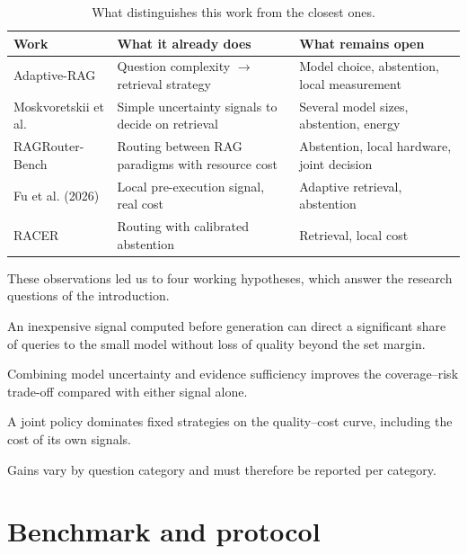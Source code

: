 \documentclass[11pt,a4paper]{article}
\begin{document}
\begin{table}[H]
\centering\small
\begin{tabularx}{\textwidth}{l Y Y}
\toprule
\textbf{Work} & \textbf{What it already does} & \textbf{What remains open} \\
\midrule
Adaptive-RAG & Question complexity $\rightarrow$ retrieval strategy & Model choice, abstention, local measurement \\
Moskvoretskii et al. & Simple uncertainty signals to decide on retrieval & Several model sizes, abstention, energy \\
RAGRouter-Bench & Routing between RAG paradigms with resource cost & Abstention, local hardware, joint decision \\
Fu et al. (2026) & Local pre-execution signal, real cost & Adaptive retrieval, abstention \\
RACER & Routing with calibrated abstention & Retrieval, local cost \\
\bottomrule
\end{tabularx}
\caption{What distinguishes this work from the closest ones.}
\label{tab:distinction}
\end{table}

These observations led us to four working hypotheses, which answer the research questions of the
introduction.

\begin{description}[style=sameline,leftmargin=1cm]
\item[H1] An inexpensive signal computed before generation can direct a significant share of queries to
the small model without loss of quality beyond the set margin.
\item[H2] Combining model uncertainty and evidence sufficiency improves the coverage--risk trade-off
compared with either signal alone.
\item[H3] A joint policy dominates fixed strategies on the quality--cost curve, including the cost of
its own signals.
\item[H4] Gains vary by question category and must therefore be reported per category.
\end{description}

\section{Benchmark and protocol}\label{sec:protocole}
\end{document}
